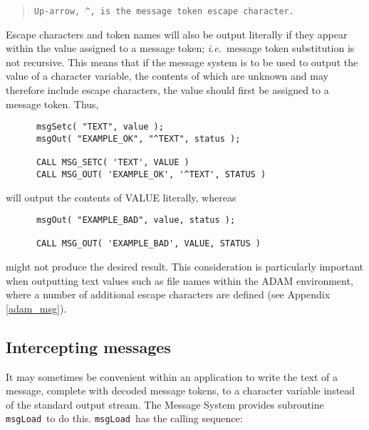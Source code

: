 \documentclass[twoside,11pt]{article}
\newcommand{\htmlref}[2]{#1}
\newcommand{\latex}[1]{#1}
\newcommand{\xlabel}[1]{}
\renewcommand{\_}{\texttt{\symbol{95}}}
\newcommand{\func}[1]{\texttt{#1}}
\newcommand{\msgload}{\func{msgLoad}}
\begin{document}
\begin {quote}
\begin {small}
\begin{verbatim}
Up-arrow, ^, is the message token escape character.
\end{verbatim}
\end {small}
\end {quote}

Escape characters and token names will also be output literally if they 
appear within the value assigned to a message token; \textit{i.e.}\ message token 
substitution is not recursive.
This means that if the message system is to be used to output the value of a 
character variable, the contents of which are unknown and may therefore 
include escape characters, the value should first be assigned to a message 
token.
Thus,

\begin {small}
\begin {verbatim}
      msgSetc( "TEXT", value );
      msgOut( "EXAMPLE_OK", "^TEXT", status );

      CALL MSG_SETC( 'TEXT', VALUE )
      CALL MSG_OUT( 'EXAMPLE_OK', '^TEXT', STATUS )
\end{verbatim}
\end {small}

will output the contents of VALUE literally, whereas

\begin {small}
\begin{verbatim}
      msgOut( "EXAMPLE_BAD", value, status );

      CALL MSG_OUT( 'EXAMPLE_BAD', VALUE, STATUS )
\end{verbatim}
\end {small}

might not produce the desired result.
This consideration is particularly important when outputting text values 
such as file names 
\htmlref{within the ADAM environment}{adam_msg},
where a number of additional escape characters are 
defined\latex{ (see Appendix \ref{adam_msg})}.


\subsection{\xlabel{intercepting_messages}Intercepting messages \label{inter_sect}}

It may sometimes be convenient within an application to write the text of a 
message, complete with decoded message tokens, to a character variable 
instead of the standard output stream.
The Message System provides subroutine \msgload\ to do this.
\msgload\ has the calling sequence:
\end{document}
